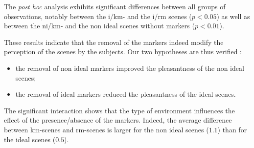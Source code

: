 \documentclass[12pt]{elsarticle}
\begin{document}
The \emph{post hoc} analysis exhibits significant differences between all groups of observations, notably between the i/km- and the i/rm scenes ($p<0.05$) as well as between the ni/km- and the non ideal scenes without markers ($p<0.01$).


These results indicate that the removal of the markers indeed modify the perception of the scenes by the subjects. Our two hypotheses are thus verified :


\begin{itemize}
\item the removal of non ideal markers improved the pleasantness of the non ideal scenes;
\item the removal of ideal markers reduced the pleasantness of the ideal scenes.
\end{itemize}


The significant interaction shows that the type of environment influences the effect of the presence/absence of the markers. Indeed, the average difference between km-scenes and rm-scenes is larger for the non ideal scenes ($1.1$) than for the ideal scenes ($0.5$).


\end{document}
